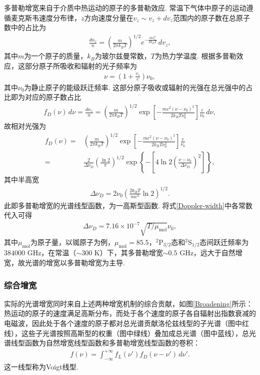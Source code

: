 \documentclass[UTF8,a4paper,10pt]{article}
\begin{document}
多普勒增宽来自于介质中热运动的原子的多普勒效应. 常温下气体中原子的运动遵循麦克斯韦速度分布律，$z$方向速度分量在$v_z\sim v_z+dv_z$范围内的原子数在总原子数中的占比为
\begin{align}
    \frac{dn_z}{n}=\left(\frac{m}{2\pi k_BT}\right)^{1/2}e^{-\frac{mv_z^2}{2k_BT}}\,dv_z,
\end{align}
其中$m$为一个原子的质量，$k_B$为玻尔兹曼常数，$T$为热力学温度. 根据多普勒效应，这部分原子所吸收和辐射的光子频率为
\begin{align}
    \nu=\left(1+\frac{v_z}{c}\right)\nu_0,
\end{align}
其中$\nu_0$为静止原子的能级跃迁频率. 这部分原子吸收或辐射的光强在总光强中的占比即为对应的原子数占比
\begin{align}
    f_D(\nu)\,d\nu=\frac{dn_z}{n}=\left(\frac{m}{2\pi k_BT}\right)^{1/2}\exp\left[-\frac{mc^2(\nu-\nu_0)^2}{2k_BT\nu_0^2}\right]\frac{c}{\nu_0}\,d\nu,
\end{align}
故相对光强为
\begin{align}
    \nonumber f_D(\nu)=&\left(\frac{m}{2\pi k_BT}\right)^{1/2}\exp\left[-\frac{mc^2(\nu-\nu_0)^2}{2k_BT\nu_0^2}\right]\frac{c}{\nu_0}\\
    =&\frac{2}{\Delta\nu_D}\left(\frac{\ln 2}{\pi}\right)^{1/2}\exp\left\{-\left[4\ln 2\left(\frac{\nu-\nu_0}{\Delta\nu_D}\right)^2\right]\right\},
\end{align}
其中半高宽
\begin{align}
    \label{Doppler-width}
    \Delta\nu_D=2\nu_0\left(\frac{2k_BT}{mc^2}\ln 2\right)^{1/2}.
\end{align}
此即多普勒增宽的光谱线型函数，为一高斯型函数. 将式\ref{Doppler-width}中各常数代入可得
\begin{align}
    \Delta\nu_D=7.16\times 10^{-7}\sqrt{T/\mu_{\text{mol}}}\nu_0,
\end{align}
其中$\mu_{\text{mol}}$为原子量，以铷原子为例，$\mu_{\text{mol}}=85.5$，$^2$P$_{3/2}$态和$^2$S$_{1/2}$态间跃迁频率为$384000$ GHz，在常温（$\sim 300$ K）下，其多普勒增宽$\sim 0.5$ GHz，远大于自然增宽，故光谱的增宽以多普勒增宽为主导.

\subsubsection{综合增宽}

实际的光谱增宽同时来自上述两种增宽机制的综合贡献，如图\ref{Broadening}所示：热运动的原子的速度满足高斯分布，而处于各个速度的原子各自辐射出指数衰减的电磁波，因此处于各个速度的原子都对总光谱贡献洛伦兹线型的子光谱（图中红线），这些子光谱按照高斯型的权重（图中绿线）叠加成总光谱（图中蓝线），总光谱线型函数为自然增宽线型函数和多普勒增宽线型函数的卷积：
\begin{align}
    f(\nu)=\int_{-\infty}^{+\infty}f_L(\nu')f_D(\nu-\nu')\,d\nu'.
\end{align}
这一线型称为Voigt线型.
\end{document}
